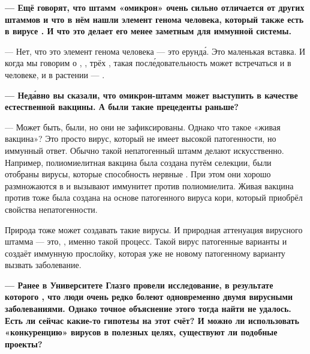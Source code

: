 {\bf --- Ещё говорят, что штамм «омикрон» очень сильно отличается от других штаммов и что в нём нашли элемент генома человека, который также есть в вирусе . И что это делает его менее заметным для иммунной системы.}

--- Нет, что это элемент генома человека --- это ерунд\'{а}. Это маленькая вставка. И когда мы говорим о , , трёх , такая посл\'{е}довательность может встречаться и в человеке, и в растении --- .

{\bf --- Нед\'{а}вно вы сказали, что омикрон-штамм может выступить в качестве естественной вакцины. А были такие прецеденты раньше?}

---  Может быть, были, но они не зафиксированы. Однако что такое «живая вакцина»? Это просто вирус, который не имеет высокой патогенности, но  иммунный ответ. Обычно такой непатогенный штамм делают искусственно. Например, полиомиелитная вакцина была создана путём селекции, были отобраны вирусы, которые  способность  нервные . При этом они хорошо размножаются в  и вызывают  иммунитет против полиомиелита. Живая вакцина против  тоже была создана на основе патогенного вируса кори, который приобрёл свойства непатогенности.

Природа тоже может создавать такие вирусы. И природная аттенуация вирусного штамма --- это, , именно такой процесс. Такой вирус  патогенные варианты и создаёт иммунную прослойку, которая уже не  новому патогенному варианту вызвать заболевание.

{\bf --- Ранее в Университете Глазго провели исследование, в результате которого , что люди очень редко болеют одновременно двумя вирусными заболеваниями. Однако точное объяснение этого тогда найти не удалось. Есть ли сейчас какие-то гипотезы на этот счёт? И можно ли использовать «конкуренцию» вирусов в полезных целях, существуют ли подобные проекты?}

